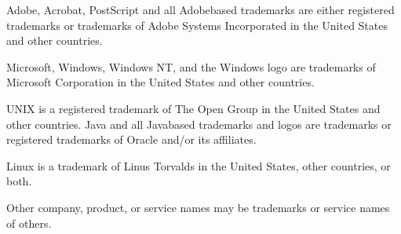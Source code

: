 \documentclass[letterpaper,10pt,english]{sphinxmanual}
\begin{document}
\sphinxAtStartPar
Adobe, Acrobat, PostScript and all Adobe\sphinxhyphen{}based trademarks are either registered trademarks or trademarks of Adobe
Systems Incorporated in the United States and other countries.

\sphinxAtStartPar
Microsoft, Windows, Windows NT, and the Windows logo are trademarks of Microsoft Corporation in the United States
and other countries.

\sphinxAtStartPar
UNIX is a registered trademark of The Open Group in the United States and other countries.
Java and all Java\sphinxhyphen{}based trademarks and logos are trademarks or registered trademarks of Oracle and/or its affiliates.

\sphinxAtStartPar
Linux is a trademark of Linus Torvalds in the United States, other countries, or both.

\sphinxAtStartPar
Other company, product, or service names may be trademarks or service names of others.



\renewcommand{\indexname}{Index}
\printindex
\end{document}
